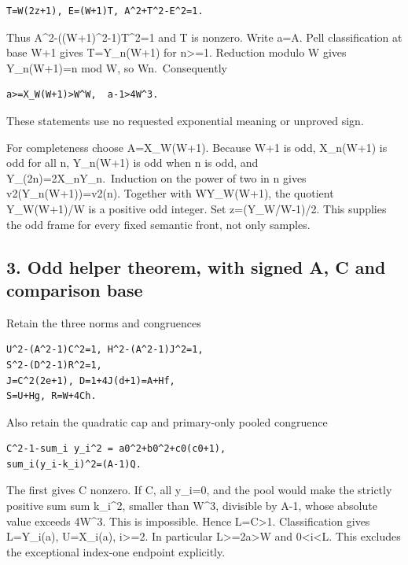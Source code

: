 \begin{verbatim}
T=W(2z+1), E=(W+1)T, A^2+T^2-E^2=1.
\end{verbatim}

Thus A\^{}2-((W+1)\^{}2-1)T\^{}2=1 and T is nonzero. Write
a=\textbar A\textbar. Pell classification at base W+1 gives
\textbar T\textbar=Y\_n(W+1) for n\textgreater=1. Reduction modulo W
gives Y\_n(W+1)=n mod W, so W\textbar n.~Consequently

\begin{verbatim}
a>=X_W(W+1)>W^W,  a-1>4W^3.
\end{verbatim}

These statements use no requested exponential meaning or unproved sign.

For completeness choose A=X\_W(W+1). Because W+1 is odd, X\_n(W+1) is
odd for all n, Y\_n(W+1) is odd when n is odd, and
Y\_(2n)=2X\_nY\_n.~Induction on the power of two in n gives
v2(Y\_n(W+1))=v2(n). Together with W\textbar Y\_W(W+1), the quotient
Y\_W(W+1)/W is a positive odd integer. Set z=(Y\_W/W-1)/2. This supplies
the odd frame for every fixed semantic front, not only samples.

\subsection{3. Odd helper theorem, with signed A, C and comparison
base}\label{odd-helper-theorem-with-signed-a-c-and-comparison-base}

Retain the three norms and congruences

\begin{verbatim}
U^2-(A^2-1)C^2=1, H^2-(A^2-1)J^2=1,
S^2-(D^2-1)R^2=1,
J=C^2(2e+1), D=1+4J(d+1)=A+Hf,
S=U+Hg, R=W+4Ch.
\end{verbatim}

Also retain the quadratic cap and primary-only pooled congruence

\begin{verbatim}
C^2-1-sum_i y_i^2 = a0^2+b0^2+c0(c0+1),
sum_i(y_i-k_i)^2=(A-1)Q.
\end{verbatim}

The first gives C nonzero. If \textbar C, all y\_i=0, and the
pool would make the strictly positive sum sum k\_i\^{}2, smaller than
W\^{}3, divisible by A-1, whose absolute value exceeds 4W\^{}3. This is
impossible. Hence L=\textbar C\textbar\textgreater1. Classification
gives L=Y\_i(a), \textbar U\textbar=X\_i(a), i\textgreater=2. In
particular L\textgreater=2a\textgreater W and 0\textless i\textless L.
This excludes the exceptional index-one endpoint explicitly.

